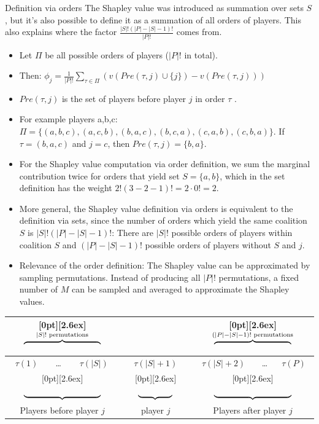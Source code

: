 \documentclass[11pt,compress,t,notes=noshow, aspectratio=169, xcolor=table]{beamer}
\begin{document}
\begin{vbframe}{Definition via orders}
The Shapley value was introduced as summation over sets $S$, but it's also possible to define it as a summation of all orders of players.
This also explains where the factor $\frac{|S|!(|P| - |S| - 1)!}{|P|!}$ comes from.
\begin{itemize}
  \item Let $\Pi$ be all possible orders of players ($|P|!$ in total).
  \item Then: $\phi_j = \frac{1}{|P|!} \sum_{\tau \in \Pi} (v(Pre(\tau,j) \cup \{j\}) - v(Pre(\tau,j)))$
  \item $Pre(\tau,j)$ is the set of players before player $j$ in order $\tau$ .
  \item For example players a,b,c: $\Pi = \{(a,b,c), (a,c,b), (b,a,c), (b,c,a), (c,a,b), (c,b,a)\}$. If $\tau = (b,a,c)$ and $j=c$, then $Pre(\tau,j) = \{b, a\}$.
  \item For the Shapley value computation via order definition, we sum the marginal contribution twice for orders that yield set $S = \{a,b\}$, which in the set definition has the weight $2! (3 - 2 - 1)! = 2 \cdot 0! = 2$.
  \item More general, the Shapley value definition via orders is equivalent to the definition via sets, since the number of orders which yield the same coalition $S$ is  $|S|!(|P| - |S| - 1)!$: There are $|S|!$ possible orders of players within coalition $S$ and $(|P| - |S| - 1)!$ possible orders of players without $S$ and $j$.
  \item Relevance of the order definition: The Shapley value can be approximated by sampling permutations. Instead of producing all $|P|!$ permutations, a fixed number of $M$ can be sampled and averaged to approximate the Shapley values.
\end{itemize}

  \begin{tabular}{|c|c|c|c|c|c|c|}
    \multicolumn{3}{c}{\enspace\raisebox{-3.3ex}[0pt][2.6ex]{$ \overbrace{\vphantom{-}\hspace{9em}}^{|S|! \text{ permutations}}$}} &
    \multicolumn{1}{c}{} &
    \multicolumn{3}{c}{\enspace\raisebox{-3.3ex}[0pt][2.6ex]{$ \overbrace{\vphantom{-}\hspace{9em}}^{(|P| - |S| - 1)! \text{ permutations}}$}}\\
    \hline
    $\tau(1)$ & \ldots & $\tau(|S|)$ & $\tau(|S| + 1)$ & $\tau(|S| + 2)$ & \ldots & $\tau(P)$ \\
    \hline
    \multicolumn{3}{c}{\enspace\raisebox{1.3ex}[0pt][2.6ex]{$ \underbrace{\vphantom{-}\hspace{9em}}^{}$}} &
    \multicolumn{1}{c}{\enspace\raisebox{1.3ex}[0pt][2.6ex]{$ \underbrace{\vphantom{-}\hspace{4em}}^{}$}} &
    \multicolumn{3}{c}{\enspace\raisebox{1.3ex}[0pt][2.6ex]{$ \underbrace{\vphantom{-}\hspace{9em}}^{}$}}\\
    \multicolumn{3}{c}{Players before player $j$} & \multicolumn{1}{c}{player $j$} & \multicolumn{3}{c}{Players after player $j$} \\
  \end{tabular}



\end{vbframe}
\end{document}
